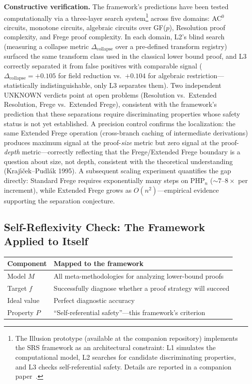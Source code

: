 \documentclass[11pt,a4paper]{article}
\theoremstyle{plain}
\theoremstyle{definition}
\theoremstyle{remark}
\begin{document}
\textbf{Constructive verification.} The framework's predictions have been tested computationally via a three-layer search system\footnote{The Illusion prototype (available at the companion repository) implements the SRS framework as an architectural constraint: L1 simulates the computational model, L2 searches for candidate discriminating properties, and L3 checks self-referential safety. Details are reported in a companion paper~\cite{Xie2026b}.} across five domains: AC$^0$ circuits, monotone circuits, algebraic circuits over GF($p$), Resolution proof complexity, and Frege proof complexity. In each domain, L2's blind search (measuring a collapse metric $\Delta_{\mathrm{collapse}}$ over a pre-defined transform registry) surfaced the same transform class used in the classical lower bound proof, and L3 correctly separated it from false positives with comparable signal ($\Delta_{\mathrm{collapse}} = +0.105$ for field reduction vs.\ $+0.104$ for algebraic restriction---statistically indistinguishable, only L3 separates them). Two independent UNKNOWN verdicts point at open problems (Resolution vs.\ Extended Resolution, Frege vs.\ Extended Frege), consistent with the framework's prediction that these separations require discriminating properties whose safety status is not yet established. A precision control confirms the localization: the same Extended Frege operation (cross-branch caching of intermediate derivations) produces maximum signal at the proof-\emph{size} metric but zero signal at the proof-\emph{depth} metric---correctly reflecting that the Frege/Extended Frege boundary is a question about size, not depth, consistent with the theoretical understanding (Kraj\'{\i}\v{c}ek--Pudl\'{a}k 1995). A subsequent scaling experiment quantifies the gap directly: Standard Frege requires exponentially many steps on PHP$_n$ ($\sim 7$--$8\times$ per increment), while Extended Frege grows as $O(n^2)$---empirical evidence supporting the separation conjecture.

\subsection{Self-Reflexivity Check: The Framework Applied to Itself}

\begin{table}[h]
\centering
\begin{tabular}{@{}ll@{}}
\toprule
Component & Mapped to the framework \\
\midrule
Model $M$ & All meta-methodologies for analyzing lower-bound proofs \\
Target $f$ & Successfully diagnose whether a proof strategy will succeed \\
Ideal value & Perfect diagnostic accuracy \\
Property $P$ & ``Self-referential safety''---this framework's criterion \\
\bottomrule
\end{tabular}
\end{table}
\end{document}
